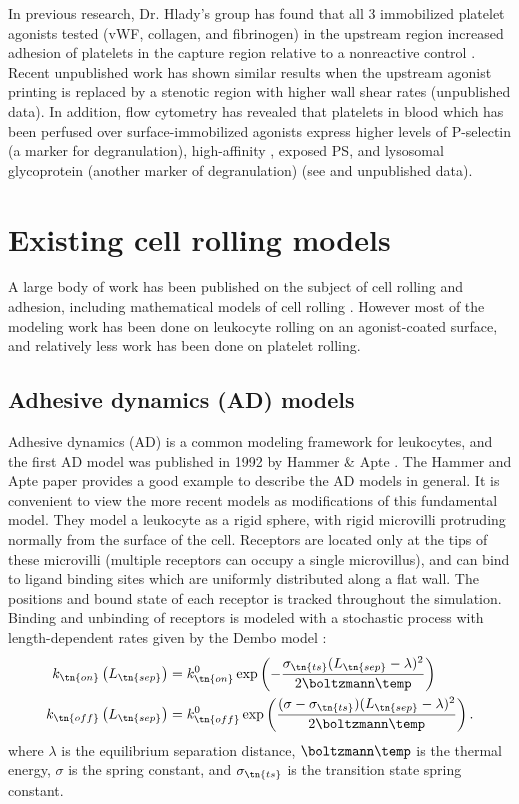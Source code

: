 In previous research, Dr. Hlady's group has found that all 3
immobilized platelet agonists tested (vWF, collagen, and fibrinogen)
in the upstream region increased adhesion of platelets in the capture
region relative to a nonreactive control
\cite{Corum2012,Eichinger2016}. Recent unpublished work has shown
similar results when the upstream agonist printing is replaced by a
stenotic region with higher wall shear rates (unpublished data). In
addition, flow cytometry has revealed that platelets in blood which
has been perfused over surface-immobilized agonists express higher
levels of P-selectin (a marker for degranulation), high-affinity
, exposed PS, and lysosomal glycoprotein (another
marker of degranulation) (see \cite{Corum2012,Eichinger2016} and
unpublished data).

\section{Existing cell rolling models}
\label{sec:exist-cell-roll}

A large body of work has been published on the subject of cell rolling
and adhesion, including mathematical models of cell rolling
\cite{Pospieszalska2009,Sundd2011}. However most of the modeling work
has been done on leukocyte rolling on an agonist-coated surface, and
relatively less work has been done on platelet rolling.

\subsection{Adhesive dynamics (AD) models}
\label{sec:adhesive-dynamics}

Adhesive dynamics (AD) is a common modeling framework for leukocytes,
and the first AD model was published in 1992 by Hammer \& Apte
\cite{Hammer1992}. The Hammer and Apte paper provides a good example
to describe the AD models in general. It is convenient to view the
more recent models as modifications of this fundamental model. They
model a leukocyte as a rigid sphere, with rigid microvilli protruding
normally from the surface of the cell. Receptors are located only at
the tips of these microvilli (multiple receptors can occupy a single
microvillus), and can bind to ligand binding sites which are uniformly
distributed along a flat wall. The positions and bound state of each
receptor is tracked throughout the simulation. Binding and unbinding
of receptors is modeled with a stochastic process with
length-dependent rates given by the Dembo model \cite{Dembo1988}:
\begin{align}
  \label{eq:dembo-on}
  k_\tn{on} \left(L_\tn{sep}\right)
  &= k_\tn{on}^0 \exp \left( -\frac{\sigma_\tn{ts} (L_\tn{sep} -
    \lambda)^2}{2\boltzmann \temp} \right) \\
  \label{eq:dembo-off}
  k_\tn{off} \left(L_\tn{sep}\right)
  &= k_\tn{off}^0 \exp \left( \frac{(\sigma - \sigma_\tn{ts})
    (L_\tn{sep} - \lambda)^2}{2 \boltzmann \temp} \right).
\end{align}
where $\lambda$ is the equilibrium separation distance,
$\boltzmann\temp$ is the thermal energy, $\sigma$ is the spring
constant, and $\sigma_\tn{ts}$ is the transition state spring
constant.

